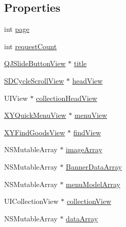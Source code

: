 \subsection*{Properties}
\begin{DoxyCompactItemize}
\item 
int \mbox{\hyperlink{category_first_home_view_controller_07_08_ab13783acf86336ce737ed5dc4e320d34}{page}}
\item 
int \mbox{\hyperlink{category_first_home_view_controller_07_08_ae95fd3f256a5fbc6a00b9c6d049f4e77}{request\+Count}}
\item 
\mbox{\hyperlink{interface_q_j_slide_button_view}{Q\+J\+Slide\+Button\+View}} $\ast$ \mbox{\hyperlink{category_first_home_view_controller_07_08_a287156b886ae68c9d3962dfefac9fd8c}{title}}
\item 
\mbox{\hyperlink{interface_s_d_cycle_scroll_view}{S\+D\+Cycle\+Scroll\+View}} $\ast$ \mbox{\hyperlink{category_first_home_view_controller_07_08_a301cbbbad89026ff40468484d4a817fd}{head\+View}}
\item 
U\+I\+View $\ast$ \mbox{\hyperlink{category_first_home_view_controller_07_08_a346104bf3c7a9a6b68a8d5e0e4a4b90a}{collection\+Head\+View}}
\item 
\mbox{\hyperlink{interface_x_y_quick_menu_view}{X\+Y\+Quick\+Menu\+View}} $\ast$ \mbox{\hyperlink{category_first_home_view_controller_07_08_a20a01335b42b44c306770db5300ede57}{menu\+View}}
\item 
\mbox{\hyperlink{interface_x_y_find_goods_view}{X\+Y\+Find\+Goods\+View}} $\ast$ \mbox{\hyperlink{category_first_home_view_controller_07_08_a5df15140c36ca58e41d559b2f7381ea9}{find\+View}}
\item 
N\+S\+Mutable\+Array $\ast$ \mbox{\hyperlink{category_first_home_view_controller_07_08_a0780f5335f64bf6a2f147c6c0ef79361}{image\+Array}}
\item 
N\+S\+Mutable\+Array $\ast$ \mbox{\hyperlink{category_first_home_view_controller_07_08_a905e4789e18f65a760349d0ac4b71ff5}{Banner\+Data\+Array}}
\item 
N\+S\+Mutable\+Array $\ast$ \mbox{\hyperlink{category_first_home_view_controller_07_08_a822a642aaef9f210c4d556dd1dee3381}{menu\+Model\+Array}}
\item 
U\+I\+Collection\+View $\ast$ \mbox{\hyperlink{category_first_home_view_controller_07_08_a6423beb28e737ae0e9a8e6c9a3d9440e}{collection\+View}}
\item 
N\+S\+Mutable\+Array $\ast$ \mbox{\hyperlink{category_first_home_view_controller_07_08_aac1a76addb581553fb9769039178fe16}{data\+Array}}

\end{DoxyCompactItemize}
